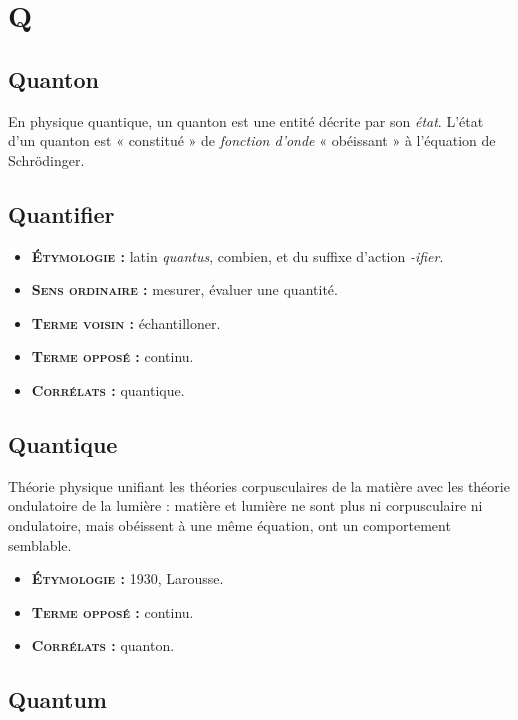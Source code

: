 \chapter{Q}
\section{Quanton}
En physique quantique, un quanton est une entité décrite par son {\it état}.
L'état d'un quanton est « constitué » de {\it fonction d'onde} « obéissant » à l'équation de Schrödinger.

\section{Quantifier}
{\footnotesize
\begin{itemize}[leftmargin=1cm, label=, itemsep=1pt]
\item {\bf \textsc{Étymologie} :} latin {\it quantus}, combien, et du suffixe d'action {\it -ifier}.
\item {\bf \textsc{Sens ordinaire} :} mesurer, évaluer une quantité.
\item {\bf \textsc{Terme voisin} :} échantilloner.
\item {\bf \textsc{Terme opposé} :} continu.
\item {\bf \textsc{Corrélats} :} quantique.
\end{itemize}
}
\section{Quantique}

Théorie physique unifiant les théories corpusculaires de la matière avec les théorie ondulatoire de la lumière : matière et lumière ne sont plus ni corpusculaire ni ondulatoire, mais obéissent à une même équation, ont un comportement semblable.

{\footnotesize
\begin{itemize}[leftmargin=1cm, label=, itemsep=1pt]
\item {\bf \textsc{Étymologie} :} 1930, Larousse.
\item {\bf \textsc{Terme opposé} :} continu.
\item {\bf \textsc{Corrélats} :} quanton.
\end{itemize}
}
\section{Quantum}

